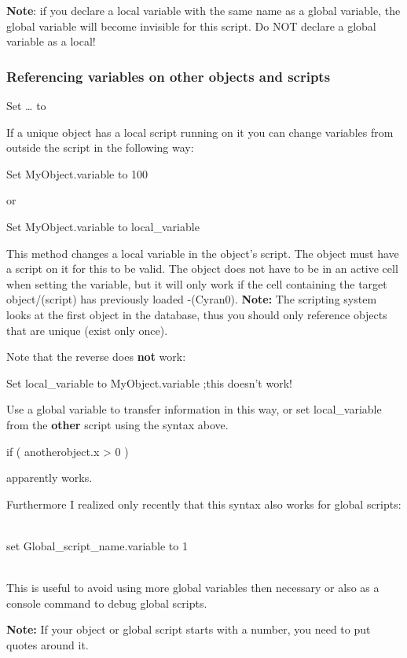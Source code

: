\documentclass[
]{article}
\begin{document}
\textbf{Note}: if you declare a local variable with the same name as a
global variable, the global variable will become invisible for this
script. Do NOT declare a global variable as a local!

\hypertarget{referencing-variables-on-other-objects-and-scripts}{%
\subsubsection{Referencing variables on other objects and
scripts}\label{referencing-variables-on-other-objects-and-scripts}}

Set \ldots{} to

If a unique object has a local script running on it you can change
variables from outside the script in the following way:

Set MyObject.variable to 100

or

Set MyObject.variable to local\_variable

This method changes a local variable in the object's script. The object
must have a script on it for this to be valid. The object does not have
to be in an active cell when setting the variable, but it will only work
if the cell containing the target object/(script) has previously loaded
-(Cyran0). \textbf{Note:} The scripting system looks at the first object
in the database, thus you should only reference objects that are unique
(exist only once).

Note that the reverse does \textbf{not} work:

Set local\_variable to MyObject.variable ;this doesn't work!

Use a global variable to transfer information in this way, or set
local\_variable from the \textbf{other} script using the syntax above.

if ( anotherobject.x \textgreater{} 0 )

apparently works.

Furthermore I realized only recently that this syntax also works for
global scripts:\\
\strut \\
set Global\_script\_name.variable to 1\\
\strut \\
This is useful to avoid using more global variables then necessary or
also as a console command to debug global scripts.

\textbf{Note:} If your object or global script starts with a number, you
need to put quotes around it.
\end{document}
